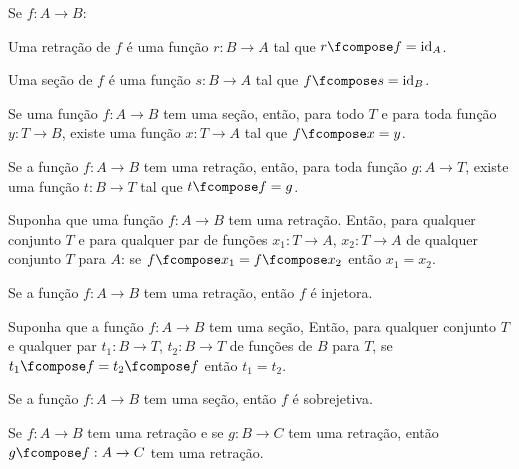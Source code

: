 \begin{definition}
    Se $f : A \to B$:

    Uma retração de $f$ é uma função $r : B \to A$ tal que $r \fcompose f = \text{id}_A$.

    Uma seção de $f$ é uma função $s : B \to A$ tal que $f \fcompose s = \text{id}_B$.
\end{definition}

\begin{exercise}
    Se uma função $f : A \to B$ tem uma seção, então, para todo $T$ e para toda função $y : T \to B$, existe uma função $x : T \to A$ tal que $f \fcompose x = y$.
\end{exercise}

\begin{exercise}
    Se a função $f : A \to B$ tem uma retração, então, para toda função $g : A \to T$, existe uma função $t : B \to T$ tal que $t \fcompose f = g$.
\end{exercise}

\begin{exercise}
    Suponha que uma função $f : A \to B$ tem uma retração. Então, para qualquer conjunto $T$ e para qualquer par de funções $x_1 : T \to A$, $x_2 : T \to A$ de qualquer conjunto $T$ para $A$: se $f \fcompose x_1 = f \fcompose x_2$ então $x_1 = x_2$.
\end{exercise}

\begin{exercise}
    Se a função $f : A \to B$ tem uma retração, então $f$ é injetora.
\end{exercise}

\begin{homework}
    Suponha que a função $f : A \to B$ tem uma seção, Então, para qualquer conjunto $T$ e qualquer par $t_1 : B \to T$, $t_2 : B \to T$ de funções de $B$ para $T$, se $t_1 \fcompose f = t_2 \fcompose f$ então $t_1 = t_2$.
\end{homework}

\begin{exercise}
    Se a função $f : A \to B$ tem uma seção, então $f$ é sobrejetiva.
\end{exercise}

\begin{exercise}
    Se $f : A \to B$ tem uma retração e se $g : B \to C$ tem uma retração, então $g \fcompose f : A \to C$ tem uma retração.
\end{exercise}

